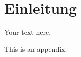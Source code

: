 \documentclass[%
    auto-generate   = false,            %
    debug           = false,            %
    print-ndn       = true,             %
    print-loa       = true,             %
    print-lof       = true,             %
    print-lot       = true,             %
    print-lol       = true,             %
    bib-file        = literature.bib,   %
    plantuml        = false,            %
    title-style     = default,          %
    font-size       = 12pt              %
]{udhbwvst}
\begin{document}
\dhbwSetFrontMatter

\dhbwPrintTitle
\dhbwPrintNonDisclosureNotice
\dhbwPrintTableOfContents

\dhbwSetListMatter

\dhbwPrintListOfAcronyms
\dhbwPrintListOfFigures
\dhbwPrintListOfTables
\dhbwPrintListOfListings

\dhbwSetMainMatter

\section{Einleitung}

Your text here.

\begin{dhbwappendices}

    This is an appendix.

\end{dhbwappendices}

\dhbwPrintBibliography
\dhbwPrintIndependenceNotice
\end{document}
